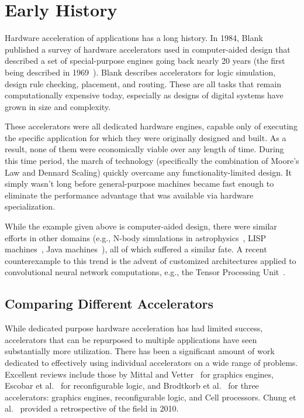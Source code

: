 \section{Early History}
\label{sec:history}

Hardware acceleration of applications has a long history.
In 1984, Blank~\cite{Blank84}
published a survey of hardware accelerators used in computer-aided design 
that described a set of special-purpose engines going back nearly 20 years
(the first being described in 1969~\cite{McKay69}).
Blank describes accelerators for logic simulation, design rule checking,
placement, and routing. These are all tasks that remain computationally
expensive today, especially as designs of digital systems have grown in size
and complexity.

These accelerators were all dedicated hardware engines, capable only
of executing the specific application for which they were originally designed
and built. As a result, none of them were economically viable over any
length of time.  During this time period, the march of technology (specifically
the combination of Moore's Law and Dennard Scaling) quickly
overcame any functionality-limited design.  It simply wasn't long
before general-purpose machines became fast enough to eliminate the
performance advantage that was available via hardware specialization.

While the example given above is computer-aided design, there were similar
efforts in other domains (e.g., N-body simulations in
astrophysics~\cite{grapenature,grape},
LISP machines~\cite{lisp,alphalisp},
Java machines~\cite{java,Schoeberl08}),
all of which suffered a similar fate.
A recent counterexample to this trend is the advent of customized
architectures applied to convolutional neural network computations,
e.g., the Tensor Processing Unit~\cite{tpu}.

\subsection{Comparing Different Accelerators}
\label{sec:compare}

While dedicated purpose hardware acceleration has had limited success,
accelerators that can be repurposed to multiple applications have seen
substantially more utilization.
There has been a significant amount of work dedicated to effectively
using individual accelerators on a wide range of problems.  Excellent reviews
include those by Mittal and Vetter~\cite{mv15} for graphics engines,
Escobar et al.~\cite{ecv16} for reconfigurable logic, and
Brodtkorb et al.~\cite{bdh+10} for three accelerators: graphics engines,
reconfigurable logic, and Cell processors.
Chung et al.~\cite{cmhm10} provided a retrospective of the field in 2010.

